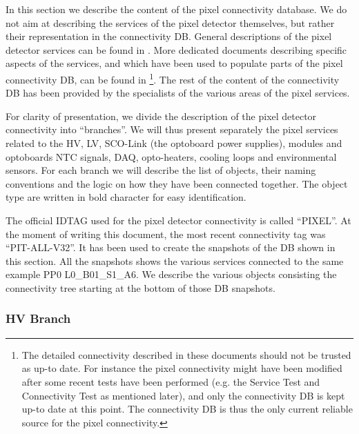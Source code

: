 In this section we describe the content of the pixel connectivity database. We do not aim at 
describing the services of the pixel detector themselves, but rather
their representation in the connectivity DB. General descriptions of the pixel detector services can be found
in \cite{pixelpaper,requirements_services}. More dedicated documents describing specific aspects of the services, 
and which have been used to populate parts of the pixel connectivity DB, can be found in
\cite{atl0092,atl0093,atl0094,atl0102,atl0104,atl0132}\footnote{The detailed connectivity described in these documents 
should not be trusted as up-to date. For instance the pixel connectivity might have been modified after some recent tests have been
performed (e.g. the Service Test and Connectivity Test as mentioned later), and only the connectivity DB is kept 
up-to date at this point. The connectivity DB is thus the only current reliable 
source for the pixel connectivity.}. The rest of the content of the connectivity DB has been 
provided by the specialists of the various areas of the pixel services. 

For clarity of presentation,
we divide the description of the pixel detector connectivity into ``branches''. We will thus present separately 
the pixel services related to the HV, LV, SCO-Link 
(the optoboard power supplies), modules and optoboards NTC signals, DAQ, opto-heaters, cooling loops 
and environmental sensors. For each branch we will describe the list of objects, their naming conventions
and the logic on how they have been connected together. The object type are written in bold character
for easy identification.

The official IDTAG used for the pixel detector connectivity is called ``PIXEL''. At the moment of writing this document,
the most recent connectivity tag was ``PIT-ALL-V32''. It has been used to create the snapshots of the DB shown in 
this section. All the snapshots shows the various services connected to the same example PP0 L0\_B01\_S1\_A6.  
We describe the various objects consisting the connectivity tree starting at the bottom of those DB snapshots.

\subsubsection{HV Branch}
\label{sec:hv_branch}

